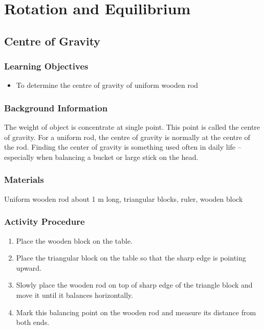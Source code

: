 \section{Rotation and Equilibrium}

\subsection{Centre of Gravity}

\subsubsection*{Learning Objectives}
\begin{itemize}
\item{To determine the centre of gravity of uniform wooden rod} 
\end{itemize}

\subsubsection*{Background Information}
The weight of object is concentrate at single point. This point is called the centre of gravity. For a uniform rod, the centre of gravity is normally at the centre of the rod.  Finding the center of gravity is something used often in daily life -- especially when balancing a bucket or large stick on the head.

\subsubsection*{Materials}
Uniform wooden rod about 1 m long, triangular blocks, ruler, wooden block

\subsubsection*{Activity Procedure}
\begin{enumerate}
\item{Place the wooden block on the table.} 
\item{Place the triangular block on the table so that the sharp edge is pointing upward.} 
\item{Slowly place the wooden rod on top of sharp edge of the triangle block and move it until it balances horizontally.} 
\item{Mark this balancing point on the wooden rod and measure its distance from both ends.} 
\end{enumerate}

